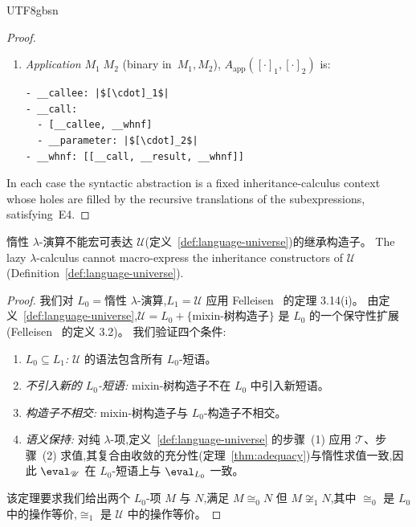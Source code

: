 \begin{CJK*}{UTF8}{gbsn}
\begin{proof}
\begin{enumerate}
      \begin{verbatim}
- __whnf:
  - |$x$|: [[__parameter]]
  - __parameter: []
  - __result: |$[\cdot]_1$|
      \end{verbatim}
    \item \emph{Application} $M_1\; M_2$ (binary in~$M_1, M_2$), $A_{\text{app}}([\cdot]_1, [\cdot]_2)$ is:
      \begin{verbatim}
- __callee: |$[\cdot]_1$|
- __call:
  - [__callee, __whnf]
  - __parameter: |$[\cdot]_2$|
- __whnf: [[__call, __result, __whnf]]
      \end{verbatim}
  \end{enumerate}
  In each case the syntactic abstraction is a fixed
  inheritance-calculus context whose holes are filled
  by the recursive translations of the subexpressions,
  satisfying~E4.
  \fi
\end{proof}

\begin{theorem}
  \label{thm:cartesian-nonexpressibility}
  \ifPaperChinese
  惰性 $\lambda$-演算不能宏可表达 $\mathscr{U}$(定义~\ref{def:language-universe})的继承构造子。
  \else
  The lazy $\lambda$-calculus cannot macro-express the
  inheritance constructors of $\mathscr{U}$
  (Definition~\ref{def:language-universe}).
  \fi
\end{theorem}

\begin{proof}
  \ifPaperChinese
  我们对 $L_0 = \text{惰性 $\lambda$-演算}$,$L_1 = \mathscr{U}$ 应用 Felleisen~\cite{felleisen1991-expressive-power} 的定理 3.14(i)。
  由定义~\ref{def:language-universe},$\mathscr{U} = L_0 + \{$mixin-树构造子$\}$ 是 $L_0$ 的一个保守性扩展(Felleisen~\cite{felleisen1991-expressive-power} 的定义 3.2)。
  我们验证四个条件:
  \begin{enumerate}
    \item[(i)] \emph{$L_0 \subseteq L_1$:} $\mathscr{U}$ 的语法包含所有 $L_0$-短语。
    \item[(ii)] \emph{不引入新的 $L_0$-短语:} mixin-树构造子不在 $L_0$ 中引入新短语。
    \item[(iii)] \emph{构造子不相交:} mixin-树构造子与 $L_0$-构造子不相交。
    \item[(iv)] \emph{语义保持:} 对纯 $\lambda$-项,定义~\ref{def:language-universe} 的步骤~(1) 应用 $\mathcal{T}$、步骤~(2) 求值,其复合由收敛的充分性(定理~\ref{thm:adequacy})与惰性求值一致,因此 $\eval_{\mathscr{U}}$ 在 $L_0$-短语上与 $\eval_{L_0}$ 一致。
  \end{enumerate}
  该定理要求我们给出两个 $L_0$-项 $M$ 与 $N$,满足 $M \cong_0 N$ 但 $M \not\cong_1 N$,其中 $\cong_0$ 是 $L_0$ 中的操作等价,$\cong_1$ 是 $\mathscr{U}$ 中的操作等价。


\end{proof}
\end{CJK*}
